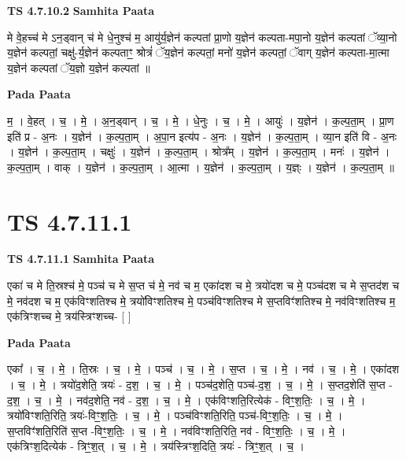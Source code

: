 \documentclass[17pt]{extarticle}
\begin{document}
\textbf{TS 4.7.10.2 } \newline
\textbf{Samhita Paata} \newline

मे वे॒हच्च॑ मे ऽन॒ड्वान् च॑ मे धे॒नुश्च॑ म॒ आयु॑र्य॒ज्ञेन॑ कल्पतां प्रा॒णो य॒ज्ञेन॑ कल्पता-मपा॒नो य॒ज्ञेन॑ कल्पतां ॅव्या॒नो य॒ज्ञेन॑ कल्पतां॒ चक्षु॑-र्य॒ज्ञेन॑ कल्पताꣳ॒॒ श्रोत्रं॑ ॅय॒ज्ञेन॑ कल्पतां॒ मनो॑ य॒ज्ञेन॑ कल्पतां॒ ॅवाग् य॒ज्ञेन॑ कल्पता-मा॒त्मा य॒ज्ञेन॑ कल्पतां ॅय॒ज्ञो य॒ज्ञेन॑ कल्पतां ॥ \newline

\textbf{Pada Paata} \newline

म॒ । वे॒हत् । च॒ । मे॒ । अ॒न॒ड्वान् । च॒ । मे॒ । धे॒नुः । च॒ । मे॒ । आयुः॑ । य॒ज्ञेन॑ । क॒ल्प॒ता॒म् । प्रा॒ण इति॑ प्र - अ॒नः । य॒ज्ञेन॑ । क॒ल्प॒ता॒म् । अ॒पा॒न इत्य॑प - अ॒नः । य॒ज्ञेन॑ । क॒ल्प॒ता॒म् । व्या॒न इति॑ वि - अ॒नः । य॒ज्ञेन॑ । क॒ल्प॒ता॒म् । चक्षुः॑ । य॒ज्ञेन॑ । क॒ल्प॒ता॒म् । श्रोत्र᳚म् । य॒ज्ञेन॑ । क॒ल्प॒ता॒म् । मनः॑ । य॒ज्ञेन॑ । क॒ल्प॒ता॒म् । वाक् । य॒ज्ञेन॑ । क॒ल्प॒ता॒म् । आ॒त्मा । य॒ज्ञेन॑ । क॒ल्प॒ता॒म् । य॒ज्ञ्ः । य॒ज्ञेन॑ । क॒ल्प॒ता॒म् ॥  \newline





\section{ TS 4.7.11.1 }

\textbf{TS 4.7.11.1 } \newline
\textbf{Samhita Paata} \newline

एका॑ च मे ति॒स्रश्च॑ मे॒ पञ्च॑ च मे स॒प्त च॑ मे॒ नव॑ च म॒ एका॑दश च मे॒ त्रयो॑दश च मे॒ पञ्च॑दश च मे स॒प्तद॑श च मे॒ नव॑दश च म॒ एक॑विꣳशतिश्च मे॒ त्रयो॑विꣳशतिश्च मे॒ पञ्च॑विꣳशतिश्च मे स॒प्तविꣳ॑शतिश्च मे॒ नव॑विꣳशतिश्च म॒ एक॑त्रिꣳशच्च मे॒ त्रय॑स्त्रिꣳशच्च- [  ] \newline

\textbf{Pada Paata} \newline

एका᳚ । च॒ । मे॒ । ति॒स्रः । च॒ । मे॒ । पञ्च॑ । च॒ । मे॒ । स॒प्त । च॒ । मे॒ । नव॑ । च॒ । मे॒ । एका॑दश । च॒ । मे॒ । त्रयो॑द॒शेति॒ त्रयः॑ - द॒श॒ । च॒ । मे॒ । पञ्च॑द॒शेति॒ पञ्च॑-द॒श॒ । च॒ । मे॒ । स॒प्तद॒शेति॑ स॒प्त - द॒श॒ । च॒ । मे॒ । नव॑द॒शेति॒ नव॑ - द॒श॒ । च॒ । मे॒ । एक॑विꣳशति॒रित्येक॑ - विꣳ॒॒श॒तिः॒ । च॒ । मे॒ । त्रयो॑विꣳशति॒रिति॒ त्रयः॑-विꣳ॒॒श॒तिः॒ । च॒ । मे॒ । पञ्च॑विꣳशति॒रिति॒ पञ्च॑-विꣳ॒॒श॒तिः॒ । च॒ । मे॒ । स॒प्तविꣳ॑शति॒रिति॑ स॒प्त -विꣳ॒॒श॒तिः॒ । च॒ । मे॒ । नव॑विꣳशति॒रिति॒ नव॑ - विꣳ॒॒श॒तिः॒ । च॒ । मे॒ । एक॑त्रिꣳश॒दित्येक॑ - त्रिꣳ॒॒श॒त् । च॒ । मे॒ । त्रय॑स्त्रिꣳश॒दिति॒ त्रयः॑ - त्रिꣳ॒॒श॒त् । च॒ ।  \newline
\end{document}
